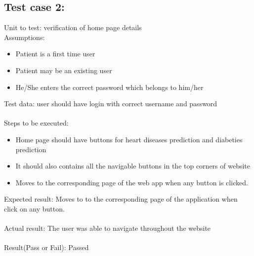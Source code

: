 \documentclass[oneside,12pt]{Classes/VTU}
\begin{document}
	\subsection{Test case 2:}
	Unit to test: verification of home page details\\
	Assumptions:\\
	\begin{itemize}
		\item Patient is a first time user
		\item Patient may be an existing user
		\item He/She enters the correct password which belongs to him/her
	\end{itemize}
	Test data: user should have login with correct username and password\\
	\\
	Steps to be executed:\\
	\begin{itemize}
		\item Home page should have buttons for heart diseases prediction and diabeties prediction
		\item It should also contains all the navigable buttons in the top corners of website
		\item Moves to the corresponding page of the web app when any button is clicked.
	\end{itemize}
	Expected result:  Moves to to the corresponding page of the application when click on any button.\\
	\\
	Actual result: The user was able to navigate throughout the website\\
	\\
	Result(Pass or Fail): Passed\\
	\\
	
\end{document}

